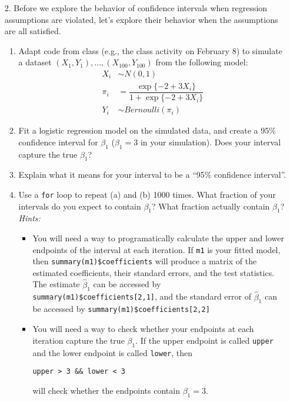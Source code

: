 \documentclass[11pt]{article}
\begin{document}
\begin{enumerate}
\item[2.] Before we explore the behavior of confidence intervals when regression assumptions are violated, let's explore their behavior when the assumptions are all satisfied.

\begin{enumerate}
\item Adapt code from class (e.g., the class activity on February 8) to simulate a dataset $(X_1, Y_1),...,(X_{100}, Y_{100})$ from the following model:
\begin{align*}
X_i &\sim N(0,1) \\
\pi_i &= \dfrac{\exp \{ -2 + 3 X_i \}}{1 + \exp\{-2 + 3 X_i\}} \\
Y_i &\sim Bernoulli(\pi_i)
\end{align*}

\item Fit a logistic regression model on the simulated data, and create a 95\% confidence interval for $\beta_1$ ($\beta_1 = 3$ in your simulation). Does your interval capture the true $\beta_1$?

\item Explain what it means for your interval to be a ``95\% confidence interval''.

\item Use a \verb;for; loop to repeat (a) and (b) 1000 times. What fraction of your intervals do you expect to contain $\beta_1$? What fraction actually contain $\beta_1$? \textit{Hints:}
\begin{itemize}
\item You will need a way to programatically calculate the upper and lower endpoints of the interval at each iteration. If \verb;m1; is your fitted model, then \verb;summary(m1)$coefficients; will produce a matrix of the estimated coefficients, their standard errors, and the test statistics. The estimate $\widehat{\beta}_1$ can be accessed by \verb;summary(m1)$coefficients[2,1];, and the standard error of $\widehat{\beta}_1$ can be accessed by \verb;summary(m1)$coefficients[2,2];

\item You will need a way to check whether your endpoints at each iteration capture the true $\beta_1$. If the upper endpoint is called \verb;upper; and the lower endpoint is called \verb;lower;, then 
\begin{verbatim}
upper > 3 && lower < 3
\end{verbatim}
will check whether the endpoints contain $\beta_1 = 3$.
\end{itemize}


\end{enumerate}
\end{enumerate}
\end{document}
